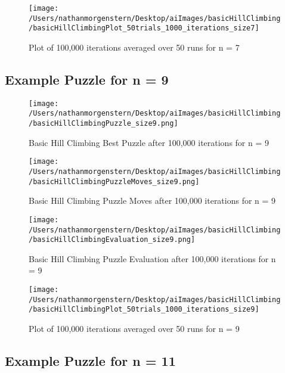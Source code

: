 \documentclass{report}
\begin{document}
	\begin{figure}[H]
	\centering
	\texttt{[image: /Users/nathanmorgenstern/Desktop/aiImages/basicHillClimbing/basicHillClimbingPlot\_50trials\_1000\_iterations\_size7]}
	\caption{Plot of 100,000 iterations averaged over 50 runs for n = 7}
	\label{fig: Plot of 100,000 iterations averaged over 50 runs for n = 7}
	\end{figure}
	
\subsection{Example Puzzle for n = 9}
	
	\begin{figure}[H]
	\centering
	\texttt{[image: /Users/nathanmorgenstern/Desktop/aiImages/basicHillClimbing/basicHillClimbingPuzzle\_size9.png]}
	\caption{Basic Hill Climbing Best Puzzle after 100,000 iterations for n = 9} 
	\label{fig: Basic Hill Climbing Best Puzzle after 100,000 iterations for n = 9}
	\end{figure}
	
	\begin{figure}[H]
	\centering
	\texttt{[image: /Users/nathanmorgenstern/Desktop/aiImages/basicHillClimbing/basicHillClimbingPuzzleMoves\_size9.png]}
	\caption{Basic Hill Climbing Puzzle Moves  after 100,000 iterations for n = 9} 
	\label{fig: Basic Hill Climbing Puzzle Moves after 100,000 iterations for n = 9}
	\end{figure}

	\begin{figure}[H]
	\centering
	\texttt{[image: /Users/nathanmorgenstern/Desktop/aiImages/basicHillClimbing/basicHillClimbingEvaluation\_size9.png]}
	\caption{Basic Hill Climbing Puzzle Evaluation after 100,000 iterations for n = 9} 
	\label{fig: Basic Hill Climbing Puzzle Evaluation after 100,000 iterations for n = 9}
	\end{figure}
	
	\begin{figure}[H]
	\centering
	\texttt{[image: /Users/nathanmorgenstern/Desktop/aiImages/basicHillClimbing/basicHillClimbingPlot\_50trials\_1000\_iterations\_size9]}
	\caption{Plot of 100,000 iterations averaged over 50 runs for n = 9}
	\label{fig: Plot of 100,000 iterations averaged over 50 runs for n = 9}
	\end{figure}
	
\subsection{Example Puzzle for n = 11}
\end{document}
